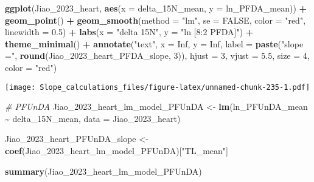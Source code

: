\documentclass[
]{article}
\newenvironment{Shaded}{\begin{snugshade}}{\end{snugshade}}
\newcommand{\AttributeTok}[1]{\textcolor[rgb]{0.13,0.29,0.53}{#1}}
\newcommand{\CommentTok}[1]{\textcolor[rgb]{0.56,0.35,0.01}{\textit{#1}}}
\newcommand{\ConstantTok}[1]{\textcolor[rgb]{0.56,0.35,0.01}{#1}}
\newcommand{\DecValTok}[1]{\textcolor[rgb]{0.00,0.00,0.81}{#1}}
\newcommand{\FloatTok}[1]{\textcolor[rgb]{0.00,0.00,0.81}{#1}}
\newcommand{\FunctionTok}[1]{\textcolor[rgb]{0.13,0.29,0.53}{\textbf{#1}}}
\newcommand{\NormalTok}[1]{#1}
\newcommand{\OtherTok}[1]{\textcolor[rgb]{0.56,0.35,0.01}{#1}}
\newcommand{\SpecialCharTok}[1]{\textcolor[rgb]{0.81,0.36,0.00}{\textbf{#1}}}
\newcommand{\StringTok}[1]{\textcolor[rgb]{0.31,0.60,0.02}{#1}}
\begin{document}
\begin{Shaded}
\begin{Highlighting}[]
\FunctionTok{ggplot}\NormalTok{(Jiao\_2023\_heart, }\FunctionTok{aes}\NormalTok{(}\AttributeTok{x =}\NormalTok{ delta\_15N\_mean, }\AttributeTok{y =}\NormalTok{ ln\_PFDA\_mean)) }\SpecialCharTok{+}
  \FunctionTok{geom\_point}\NormalTok{() }\SpecialCharTok{+}
  \FunctionTok{geom\_smooth}\NormalTok{(}\AttributeTok{method =} \StringTok{"lm"}\NormalTok{, }\AttributeTok{se =} \ConstantTok{FALSE}\NormalTok{, }\AttributeTok{color =} \StringTok{"red"}\NormalTok{, }\AttributeTok{linewidth =} \FloatTok{0.5}\NormalTok{) }\SpecialCharTok{+}
  \FunctionTok{labs}\NormalTok{(}\AttributeTok{x =} \StringTok{"delta 15N"}\NormalTok{,}
       \AttributeTok{y =} \StringTok{"ln [8:2 PFDA]"}\NormalTok{) }\SpecialCharTok{+}
  \FunctionTok{theme\_minimal}\NormalTok{() }\SpecialCharTok{+}
  \FunctionTok{annotate}\NormalTok{(}\StringTok{"text"}\NormalTok{, }\AttributeTok{x =} \ConstantTok{Inf}\NormalTok{, }\AttributeTok{y =} \ConstantTok{Inf}\NormalTok{, }\AttributeTok{label =} \FunctionTok{paste}\NormalTok{(}\StringTok{"slope ="}\NormalTok{, }\FunctionTok{round}\NormalTok{(Jiao\_2023\_heart\_PFDA\_slope, }\DecValTok{3}\NormalTok{)), }
           \AttributeTok{hjust =} \DecValTok{3}\NormalTok{, }\AttributeTok{vjust =} \FloatTok{5.5}\NormalTok{, }\AttributeTok{size =} \DecValTok{4}\NormalTok{, }\AttributeTok{color =} \StringTok{"red"}\NormalTok{)}
\end{Highlighting}
\end{Shaded}

\texttt{[image: Slope\_calculations\_files/figure-latex/unnamed-chunk-235-1.pdf]}

\begin{Shaded}
\begin{Highlighting}[]
\CommentTok{\# PFUnDA}
\NormalTok{Jiao\_2023\_heart\_lm\_model\_PFUnDA }\OtherTok{\textless{}{-}} \FunctionTok{lm}\NormalTok{(ln\_PFUnDA\_mean }\SpecialCharTok{\textasciitilde{}}\NormalTok{ delta\_15N\_mean,}
                                    \AttributeTok{data =}\NormalTok{ Jiao\_2023\_heart)}

\NormalTok{Jiao\_2023\_heart\_PFUnDA\_slope }\OtherTok{\textless{}{-}} \FunctionTok{coef}\NormalTok{(Jiao\_2023\_heart\_lm\_model\_PFUnDA)[}\StringTok{"TL\_mean"}\NormalTok{]}

\FunctionTok{summary}\NormalTok{(Jiao\_2023\_heart\_lm\_model\_PFUnDA)}
\end{Highlighting}
\end{Shaded}
\end{document}
